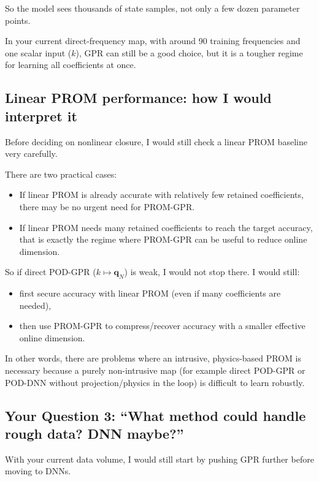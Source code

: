 \documentclass[11pt]{article}
\newcommand{\vect}[1]{\mathbf{#1}}
\begin{document}
So the model sees thousands of state samples, not only a few dozen parameter points.

In your current direct-frequency map, with around 90 training frequencies and one scalar input ($k$), GPR can still be a good choice, but it is a tougher regime for learning all coefficients at once.

\subsection*{Linear PROM performance: how I would interpret it}

Before deciding on nonlinear closure, I would still check a linear PROM baseline very carefully.

There are two practical cases:
\begin{itemize}[leftmargin=1.5em]
    \item If linear PROM is already accurate with relatively few retained coefficients, there may be no urgent need for PROM-GPR.
    \item If linear PROM needs many retained coefficients to reach the target accuracy, that is exactly the regime where PROM-GPR can be useful to reduce online dimension.
\end{itemize}

So if direct POD-GPR (\(k\mapsto \vect{q}_N\)) is weak, I would not stop there. I would still:
\begin{itemize}[leftmargin=1.5em]
    \item first secure accuracy with linear PROM (even if many coefficients are needed),
    \item then use PROM-GPR to compress/recover accuracy with a smaller effective online dimension.
\end{itemize}
In other words, there are problems where an intrusive, physics-based PROM is necessary because a purely non-intrusive map (for example direct POD-GPR or POD-DNN without projection/physics in the loop) is difficult to learn robustly.

\subsection*{Your Question 3: ``What method could handle rough data? DNN maybe?''}

With your current data volume, I would still start by pushing GPR further before moving to DNNs.
\end{document}
